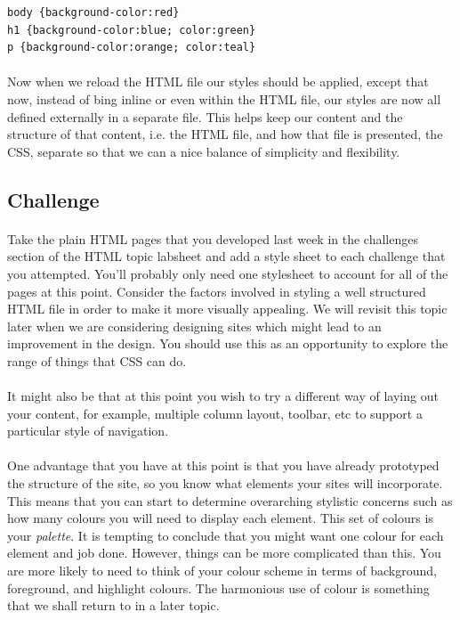 \documentclass[10pt, a4paper, twosize]{article}
\begin{document}
\begin{lstlisting}
body {background-color:red}
h1 {background-color:blue; color:green}
p {background-color:orange; color:teal}
\end{lstlisting}

\paragraph{} Now when we reload the HTML file our styles should be applied, except that now, instead of bing inline or even within the HTML file, our styles are now all defined externally in a separate file. This helps keep our content and the structure of that content, i.e. the HTML file, and how that file is presented, the CSS, separate so that we can a nice balance of simplicity and flexibility.

\subsection{Challenge}
\paragraph{} Take the plain HTML pages that you developed last week in the challenges section of the HTML topic labsheet and add a style sheet to each challenge that you attempted. You'll probably only need one stylesheet to account for all of the pages at this point. Consider the factors involved in styling a well structured HTML file in order to make it more visually appealing. We will revisit this topic later when we are considering designing sites which might lead to an improvement in the design. You should use this as an opportunity to explore the range of things that CSS can do.

\paragraph{} It might also be that at this point you wish to try a different way of laying out your content, for example, multiple column layout, toolbar, etc to support a particular style of navigation.

\paragraph{} One advantage that you have at this point is that you have already prototyped the structure of the site, so you know what elements your sites will incorporate. This means that you can start to determine overarching stylistic concerns such as how many colours you will need to display each element. This set of colours is your \emph{palette}. It is tempting to conclude that you might want one colour for each element and job done. However, things can be more complicated than this. You are more likely to need to think of your colour scheme in terms of background, foreground, and highlight colours. The harmonious use of colour is something that we shall return to in a later topic. 
\end{document}
